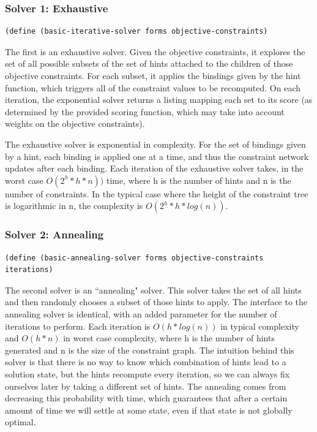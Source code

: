 \documentclass[12pt,a4paper]{article}
\begin{document}
\subsubsection{Solver 1: Exhaustive}
\begin{lstlisting}
(define (basic-iterative-solver forms objective-constraints)
\end{lstlisting}

The first is an exhaustive solver. Given the objective constraints, it explores the set of all possible subsets of the set of hints attached to the children of those objective constraints. For each subset, it applies the bindings given by the hint function, which triggers all of the constraint values to be recomputed. On each iteration, the exponential solver returns a listing mapping each set to its score (as determined by the provided scoring function, which may take into account weights on the objective constraints).

The exhaustive solver is exponential in complexity. For the set of bindings given by a hint, each binding is applied one at a time, and thus the constraint network updates after each binding. Each iteration of the exhaustive solver takes, in the worst case $O(2^{h}*h*n))$ time, where h is the number of hints and n is the number of constraints. In the typical case where the height of the constraint tree is logarithmic in n, the complexity is $O(2^{h}*h*log(n))$.
\newline

\subsubsection{Solver 2: Annealing}
\begin{lstlisting}
(define (basic-annealing-solver forms objective-constraints iterations)
\end{lstlisting}

The second solver is an ``annealing" solver. This solver takes the set of all hints and then randomly chooses a subset of those hints to apply. The interface to the annealing solver is identical, with an added parameter for the number of iterations to perform. Each iteration is $O(h * log(n))$ in typical complexity and $O(h*n)$ in worst case complexity, where h is the number of hints generated and n is the size of the constraint graph.   The intuition behind this solver is that there is no way to know which combination of hints lead to a solution state, but the hints recompute every iteration, so we can always fix ourselves later by taking a different set of hints.  The annealing comes from decreasing this probability with time, which guarantees that after a certain amount of time we will settle at some state, even if that state is not globally optimal.  
\end{document}
